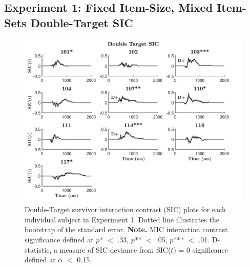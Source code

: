 \subsection{Experiment 1: Fixed Item-Size, Mixed Item-Sets Double-Target SIC}
\begin{figure}[htb]
\begin{center}
\includegraphics[width=\linewidth]{Figures/Appendix/FIG23PNG.png}
\caption{Double-Target survivor interaction contrast (SIC) plots for each individual subject in Experiment 1. Dotted line illustrates the bootstrap of the standard error.\newline
\textbf{Note.} MIC interaction contrast significance defined at $p$* $<$ .33, $p$** $<$ .05, $p$*** $<$ .01. D-statistic, a measure of SIC deviance from SIC($t$) = 0 significance defined at $\alpha$ $<$ 0.15.}
\label{fig:Indiv_SIC_AB_Ex1}
\end{center}
\end{figure}
\newpage

